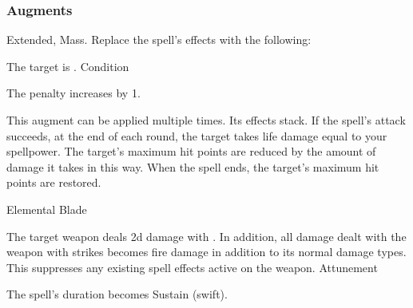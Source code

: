 \subsubsection{Augments}
 Extended, Mass.
Replace
the spell's effects with the following:
\begin{augmenteffects}
\spelleffect The target is \disoriented.
\spelldur Condition
\end{augmenteffects}
The penalty increases by 1.
\par
This augment can be applied multiple times.
Its effects stack.
If the spell's attack succeeds, at the end of each round, the target takes life damage equal to your spellpower.
The target's maximum hit points are reduced by the amount of damage it takes in this way.
When the spell ends, the target's maximum hit points are restored.
\begin{spellsection}{Elemental Blade}
\begin{spellheader}
\end{spellheader}
\begin{spellcontent}
\begin{spelltargetinginfo}
\end{spelltargetinginfo}
\begin{spelleffects}
\spelleffect
The target weapon deals \plus2d damage with .
In addition, all damage dealt with the weapon with strikes becomes fire damage in addition to its normal damage types.
This suppresses any existing spell effects active on the weapon.
\spelldur Attunement
\end{spelleffects}
\end{spellcontent}
\begin{spellfooter}
\miscastexplode
\end{spellfooter}
\begin{spellcantrip}
The spell's duration becomes Sustain (swift).
\end{spellcantrip}
\end{spellsection}
